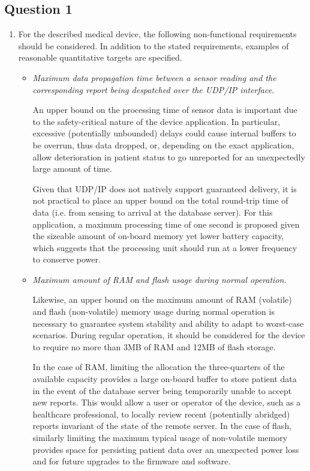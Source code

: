 \documentclass{article}
\numberwithin{equation}{section}
\numberwithin{table}{section}
\numberwithin{figure}{section}
\begin{document}
\subsection{Question 1}
\begin{enumerate}
    \item For the described medical device, the following non-functional
    requirements should be considered. In addition to the stated requirements,
    examples of reasonable quantitative targets are specified.
    \begin{itemize}
        \item \emph{Maximum data propagation time between a sensor reading and
        the corresponding report being despatched over the UDP/IP interface.}
        
        An upper bound on the processing time of sensor data is important due to
        the safety-critical nature of the device application. In particular,
        excessive (potentially unbounded) delays could cause internal buffers to
        be overrun, thus data dropped, or, depending on the exact application,
        allow deterioration in patient status to go unreported for an
        unexpectedly large amount of time.
        
        Given that UDP/IP does not natively support guaranteed delivery, it is
        not practical to place an upper bound on the total round-trip time of
        data (i.e. from sensing to arrival at the database server). For this
        application, a maximum processing time of one second is proposed given
        the sizeable amount of on-board memory yet lower battery capacity, which
        suggests that the processing unit should run at a lower frequency to
        conserve power.

        \item \emph{Maximum amount of RAM and flash usage during normal
        operation.}

        Likewise, an upper bound on the maximum amount of RAM (volatile) and
        flash (non-volatile) memory usage during normal operation is necessary
        to guarantee system stability and ability to adapt to worst-case
        scenarios. During regular operation, it should be considered for the
        device to require no more than 3MB of RAM and 12MB of flash storage.

        In the case of RAM, limiting the allocation the three-quarters of the
        available capacity provides a large on-board buffer to store patient
        data in the event of the database server being temporarily unable to
        accept new reports. This would allow a user or operator of the device,
        such as a healthcare professional, to locally review recent (potentially
        abridged) reports invariant of the state of the remote server. In the
        case of flash, similarly limiting the maximum typical usage of
        non-volatile memory provides space for persisting patient data over an
        unexpected power loss and for future upgrades to the firmware and
        software.


\end{itemize}
\end{enumerate}
\end{document}
